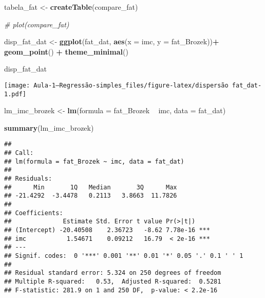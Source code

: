 \documentclass[]{article}
\newenvironment{Shaded}{\begin{snugshade}}{\end{snugshade}}
\newcommand{\CommentTok}[1]{\textcolor[rgb]{0.56,0.35,0.01}{\textit{#1}}}
\newcommand{\DataTypeTok}[1]{\textcolor[rgb]{0.13,0.29,0.53}{#1}}
\newcommand{\KeywordTok}[1]{\textcolor[rgb]{0.13,0.29,0.53}{\textbf{#1}}}
\newcommand{\NormalTok}[1]{#1}
\newcommand{\OperatorTok}[1]{\textcolor[rgb]{0.81,0.36,0.00}{\textbf{#1}}}
\newcommand{\StringTok}[1]{\textcolor[rgb]{0.31,0.60,0.02}{#1}}
\begin{document}
\begin{Shaded}
\begin{Highlighting}[]
\NormalTok{tabela_fat <-}\StringTok{ }\KeywordTok{createTable}\NormalTok{(compare_fat)}
\end{Highlighting}
\end{Shaded}

\begin{Shaded}
\begin{Highlighting}[]
\CommentTok{# plot(compare_fat)}
\end{Highlighting}
\end{Shaded}

\begin{Shaded}
\begin{Highlighting}[]
\NormalTok{disp_fat_dat <-}\StringTok{ }\KeywordTok{ggplot}\NormalTok{(fat_dat, }\KeywordTok{aes}\NormalTok{(}\DataTypeTok{x =}\NormalTok{ imc, }\DataTypeTok{y =}\NormalTok{ fat_Brozek))}\OperatorTok{+}
\StringTok{  }\KeywordTok{geom_point}\NormalTok{() }\OperatorTok{+}
\StringTok{  }\KeywordTok{theme_minimal}\NormalTok{()}

\NormalTok{disp_fat_dat}
\end{Highlighting}
\end{Shaded}

\texttt{[image: Aula-1---Regressão-simples\_files/figure-latex/dispersão fat\_dat-1.pdf]}

\begin{Shaded}
\begin{Highlighting}[]
\NormalTok{lm_imc_brozek <-}\StringTok{ }\KeywordTok{lm}\NormalTok{(}\DataTypeTok{formula =}\NormalTok{ fat_Brozek }\OperatorTok{~}\StringTok{ }\NormalTok{imc,}
                    \DataTypeTok{data =}\NormalTok{ fat_dat)}

\KeywordTok{summary}\NormalTok{(lm_imc_brozek)}
\end{Highlighting}
\end{Shaded}

\begin{verbatim}
## 
## Call:
## lm(formula = fat_Brozek ~ imc, data = fat_dat)
## 
## Residuals:
##      Min       1Q   Median       3Q      Max 
## -21.4292  -3.4478   0.2113   3.8663  11.7826 
## 
## Coefficients:
##              Estimate Std. Error t value Pr(>|t|)    
## (Intercept) -20.40508    2.36723   -8.62 7.78e-16 ***
## imc           1.54671    0.09212   16.79  < 2e-16 ***
## ---
## Signif. codes:  0 '***' 0.001 '**' 0.01 '*' 0.05 '.' 0.1 ' ' 1
## 
## Residual standard error: 5.324 on 250 degrees of freedom
## Multiple R-squared:   0.53,  Adjusted R-squared:  0.5281 
## F-statistic: 281.9 on 1 and 250 DF,  p-value: < 2.2e-16
\end{verbatim}
\end{document}
